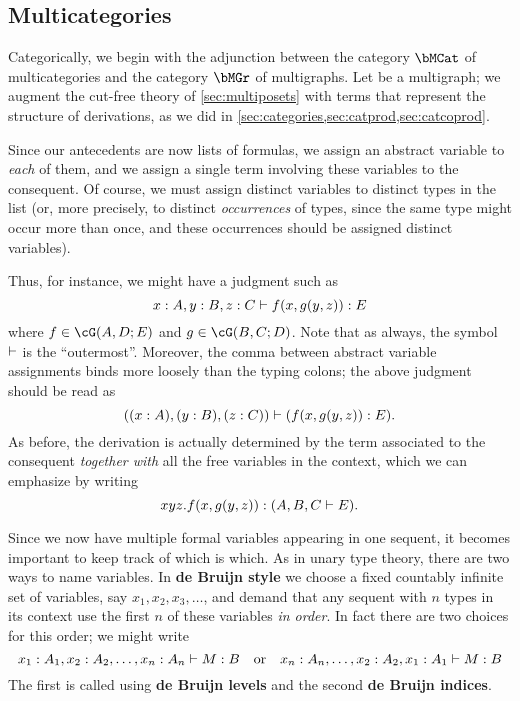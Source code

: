 \subsection{Multicategories}
\label{sec:multicats}

Categorically, we begin with the adjunction between the category $\bMCat$ of multicategories and the category $\bMGr$ of multigraphs.
Let \cG be a multigraph; we augment the cut-free theory of \cref{sec:multiposets} with terms that represent the structure of derivations, as we did in \cref{sec:categories,sec:catprod,sec:catcoprod}.

Since our antecedents are now lists of formulas, we assign an abstract variable to \emph{each} of them, and we assign a single term involving these variables to the consequent.
Of course, we must assign distinct variables to distinct types in the list (or, more precisely, to distinct \emph{occurrences} of types, since the same type might occur more than once, and these occurrences should be assigned distinct variables).

Thus, for instance, we might have a judgment such as
\[ x:A, y:B, z:C \vdash f(x,g(y,z)):E \]
where $f\in\cG(A,D;E)$ and $g\in\cG(B,C;D)$.
Note that as always, the symbol $\vdash$ is the ``outermost''.
Moreover, the comma between abstract variable assignments binds more loosely than the typing colons; the above judgment should be read as
\[ ((x:A), (y:B), (z:C)) \vdash (f(x,g(y,z)):E). \]
As before, the derivation is actually determined by the term associated to the consequent \emph{together with} all the free variables in the context, which we can emphasize by writing
\[ xyz.f(x,g(y,z)) : (A, B, C \vdash E). \]

Since we now have multiple formal variables appearing in one sequent, it becomes important to keep track of which is which.
As in unary type theory, there are two ways to name variables.
In \textbf{de Bruijn style} we choose a fixed countably infinite set of variables, say $x_1,x_2,x_3,\dots$, and demand that any sequent with $n$ types in its context use the first $n$ of these variables \emph{in order}.
In fact there are two choices for this order; we might write
\[ x_1:A_1, x_2:A_2, \dots,x_n:A_n \vdash M:B \quad\text{or}\quad
x_n:A_n,\dots, x_2:A_2, x_1:A_1 \vdash M:B
\]
The first is called using \textbf{de Bruijn levels} and the second \textbf{de Bruijn indices}.

